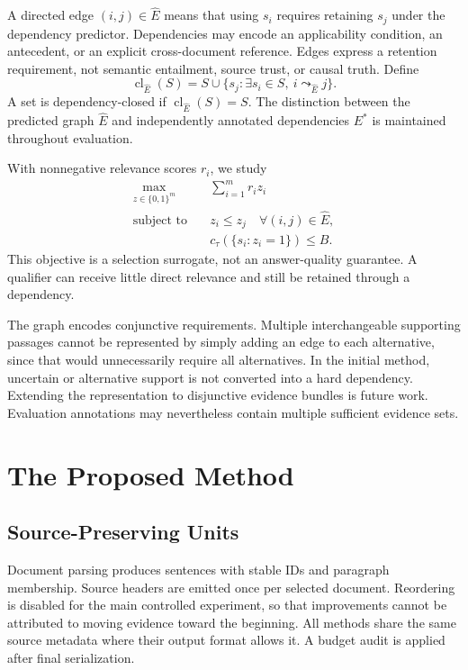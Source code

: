 \documentclass[10pt,twocolumn]{article}
\newcommand{\cl}{\operatorname{cl}}
\begin{document}
A directed edge $(i,j)\in\widehat E$ means that using $s_i$ requires retaining $s_j$ under the dependency predictor. Dependencies may encode an applicability condition, an antecedent, or an explicit cross-document reference. Edges express a retention requirement, not semantic entailment, source trust, or causal truth. Define
\begin{equation}
 \cl_{\widehat E}(S)=S\cup\{s_j:\exists s_i\in S,\ i\leadsto_{\widehat E}j\}.
\end{equation}
A set is dependency-closed if $\cl_{\widehat E}(S)=S$. The distinction between the predicted graph $\widehat E$ and independently annotated dependencies $E^*$ is maintained throughout evaluation.

With nonnegative relevance scores $r_i$, we study
\begin{align}
 \max_{z\in\{0,1\}^m}\quad &\sum_{i=1}^{m}r_i z_i \label{eq:objective}\\
 \text{subject to}\quad &z_i\le z_j\quad\forall(i,j)\in\widehat E,\nonumber\\
 &c_\tau(\{s_i:z_i=1\})\le B.\nonumber
\end{align}
This objective is a selection surrogate, not an answer-quality guarantee. A qualifier can receive little direct relevance and still be retained through a dependency.

The graph encodes conjunctive requirements. Multiple interchangeable supporting passages cannot be represented by simply adding an edge to each alternative, since that would unnecessarily require all alternatives. In the initial method, uncertain or alternative support is not converted into a hard dependency. Extending the representation to disjunctive evidence bundles is future work. Evaluation annotations may nevertheless contain multiple sufficient evidence sets.

\section{The Proposed Method}
\subsection{Source-Preserving Units}
Document parsing produces sentences with stable IDs and paragraph membership. Source headers are emitted once per selected document. Reordering is disabled for the main controlled experiment, so that improvements cannot be attributed to moving evidence toward the beginning. All methods share the same source metadata where their output format allows it. A budget audit is applied after final serialization.
\end{document}
